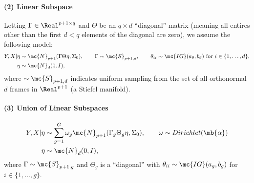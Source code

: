 \paragraph{(2) Linear Subspace} Letting $\Gamma \in \Real^{p+1 \times q}$ and $\Theta$ be an ${q \times d}$ ``diagonal'' matrix (meaning all entires other than the first $d < q$ elements of the diagonal are zero), we assume the following model:
	\begin{subequations} \label{eq:linear}
	\begin{align}
		Y,X |\eta &\sim \mc{N}_{p+1}(\Gamma \Theta \eta ,\Sigma_0),\qquad  \Gamma \sim \mc{S}_{p+1,d}, \qquad \theta_{ii} \sim \mc{IG}(a_\theta,b_\theta) \text{ for } i \in \{1, \ldots, d\}, \\
		\eta  &\sim \mc{N}_d(0, I), 
	\end{align}
	\end{subequations}
	where $\sim \mc{S}_{p+1,d}$ indicates uniform sampling from the set of all orthonormal $d$ frames in $\Real^{p+1}$ (a Stiefel manifold).

\paragraph{(3) Union of Linear Subspaces}
\begin{subequations} \label{eq:linear}
\begin{align}
	Y,X |\eta &\sim \sum_{g=1}^G \omega_g \mc{N}_{p+1}(\Gamma_g \Theta_g \eta ,\Sigma_0), \qquad \omega \sim Dirichlet(\mb{\alpha}) \\
	\eta  &\sim \mc{N}_d(0, I), 
\end{align}
\end{subequations}
where $\Gamma \sim \mc{S}_{p+1,g}$ and $\Theta_g$ is a ``diagonal'' with $\theta_{ii} \sim \mc{IG}(a_g,b_g)$ for  $i \in \{1, \ldots, g\}$. %


